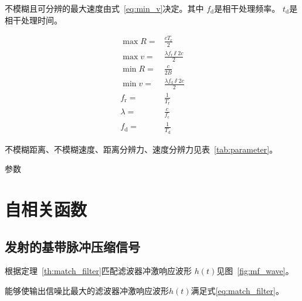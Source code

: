 \documentclass[../main]{subfiles}
\begin{document}
\begin{theorem}[速度分辨力]%
  \label{th:min_v}
  不模糊且可分辨的最大速度由式~\ref{eq:min_v}决定。其中
  $f_\mathrm{d}$是相干处理频率。
  $t_\mathrm{d}$是相干处理时间。
\end{theorem}

\begin{align}
  \label{eq:max_r}
  \max{R} = & \frac{cT_\mathrm{r}}{2}\\
  \label{eq:max_v}
  \max{v} = & \frac{\lambda f_\mathrm{r}\varparallel 2c}{2}\\
  \label{eq:min_r}
  \min{R} = & \frac{c}{2B}\\
  \label{eq:min_v}
  \min{v} = & \frac{\lambda f_\mathrm{d}\varparallel 2c}{2}\\
  f_\mathrm{r} = & \frac{1}{T_\mathrm{r}}\\
  \lambda = & \frac{c}{f_\mathrm{c}}\\
  f_\mathrm{d} = & \frac{1}{T_\mathrm{d}}
\end{align}

\begin{Answer}[ref = ex:1]
  不模糊距离、不模糊速度、距离分辨力、速度分辨力见表~\ref{tab:parameter}。
\end{Answer}

\begin{table}[htbp]
  \centering
  \caption{参数}%
  \label{tab:parameter}
\end{table}

\section{自相关函数}%
\label{sec:self_coherent}

\subsection{发射的基带脉冲压缩信号}%
\label{sub:self_coherent}

根据定理~\ref{th:match_filter}匹配滤波器冲激响应波形
$h(t)$见图~\ref{fig:mf_wave}。

\begin{theorem}[匹配滤波器]%
  \label{th:match_filter}
  能够使输出信噪比最大的滤波器冲激响应波形$h(t)$满足式\ref{eq:match_filter}。
\end{theorem}
\end{document}
